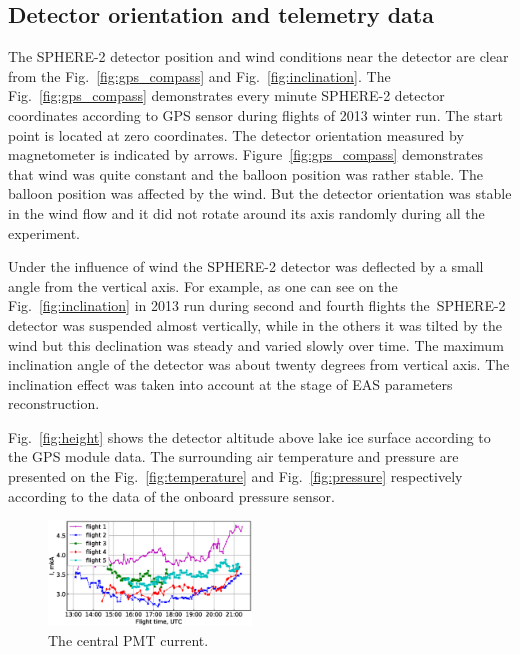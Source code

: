 \documentclass[final,5p,times,twocolumn]{elsarticle}
\begin{document}
\subsection{Detector orientation and telemetry data\label{sect:telemetrydata}}

The \mbox{SPHERE-2} detector position and wind conditions near the detector are clear from the Fig.~\ref{fig:gps_compass} and Fig.~\ref{fig:inclination}. The Fig.~\ref{fig:gps_compass} demonstrates every minute \mbox{SPHERE-2} detector coordinates according to GPS sensor during flights of 2013 winter run. The start point is located at zero coordinates. The detector orientation measured by magnetometer is indicated by arrows. Figure~\ref{fig:gps_compass} demonstrates that wind was quite constant and the balloon position was rather stable. The balloon position was affected by the wind. But the detector orientation was stable in the wind flow and it did not rotate around its axis randomly during all the experiment.  

Under the influence of wind the SPHERE-2 detector was deflected by a small angle from the vertical axis. For example, as one can see on the Fig.~\ref{fig:inclination} in 2013 run during second and fourth flights the~\mbox{SPHERE-2} detector was suspended almost vertically, while in the others it was tilted by the wind but this declination was steady and varied slowly over time. The maximum inclination angle of the detector was about twenty degrees from vertical axis. The inclination effect was taken into account at the stage of EAS parameters reconstruction.

Fig.~\ref{fig:height} shows the detector altitude above lake ice surface according to the GPS module data. The surrounding air temperature and pressure are presented on the Fig.~\ref{fig:temperature} and Fig.~\ref{fig:pressure} respectively according to the data of the onboard pressure sensor.


\begin{figure}[tb]
\includegraphics[width=0.48\textwidth]{figs/cur2013_PMT1.eps}
\caption{The central PMT current.}
\label{fig:current}
\end{figure}
\end{document}
